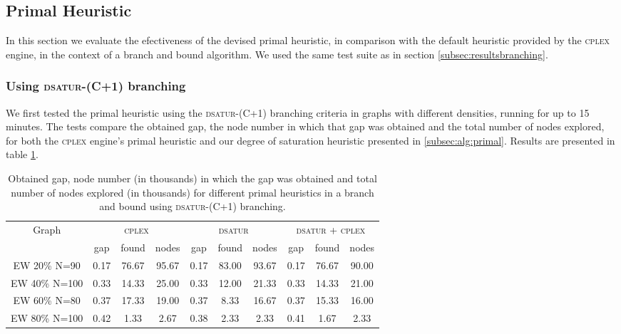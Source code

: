 
\subsection{Primal Heuristic}
\label{subsec:resultsprimal}

In this section we evaluate the efectiveness of the devised primal heuristic, in comparison with the default heuristic provided by the \textsc{cplex} engine, in the context of a branch and bound algorithm. We used the same test suite as in section \ref{subsec:resultsbranching}.


\subsubsection*{Using \textsc{dsatur-(C+1)} branching}

We first tested the primal heuristic using the \textsc{dsatur-(C+1)} branching criteria in graphs with different densities, running for up to 15 minutes. The tests compare the obtained gap, the node number in which that gap was obtained and the total number of nodes explored, for both the \textsc{cplex} engine's primal heuristic and our degree of saturation heuristic presented in \ref{subsec:alg:primal}. Results are presented in table \ref{table:primal:dsatur}.

\begin{table}[h]
\label{table:primal:dsatur}
\centering

\begin{tabular}{|c|ccc|ccc|ccc|}
\hline
\multicolumn{1}{|c|}{Graph} & \multicolumn{3}{|c|}{\textsc{cplex}} & \multicolumn{3}{|c|}{\textsc{dsatur}} & \multicolumn{3}{|c|}{\textsc{dsatur} + \textsc{cplex}}
\\
 & gap & found & nodes & gap & found & nodes & gap & found & nodes 
\\
\hline
EW 20\% N=90 & 0.17 & 76.67 & 95.67 & 0.17 & 83.00 & 93.67 & 0.17 & 76.67 & 90.00
\\
EW 40\% N=100 & 0.33 & 14.33 & 25.00 & 0.33 & 12.00 & 21.33 & 0.33 & 14.33 & 21.00
\\
EW 60\% N=80 & 0.37 & 17.33 & 19.00 & 0.37 & 8.33 & 16.67 & 0.37 & 15.33 & 16.00
\\
EW 80\% N=100 & 0.42 & 1.33 & 2.67 & 0.38 & 2.33 & 2.33 & 0.41 & 1.67 & 2.33
\\
\hline 
\end{tabular}

\caption{Obtained gap, node number (in thousands) in which the gap was obtained and total number of nodes explored (in thousands) for different primal heuristics in a branch and bound using \textsc{dsatur-(C+1)} branching.}

\end{table}


